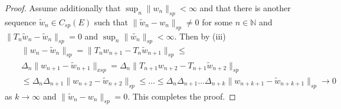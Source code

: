 \documentclass[10pt,a4paper]{amsart}
\begin{document}
\begin{proof}
Assume additionally that $\sup_n \|w_n\|_{sp}<\infty$ and that there is another sequence $\tilde{w}_n\in C_{sp}(E)$ such that $\|\tilde{w}_n-w_n\|_{sp} \neq 0$ for some $n\in \mathbb{N}$ and $\|T_n\tilde{w}_n-\tilde{w}_n\|_{sp}=0$ and $\sup_n \|\tilde{w_n}\|_{sp}<\infty$. Then by (iii)
\begin{eqnarray}
&& \|w_n-\tilde{w}_n\|_{sp}=\|T_nw_{n+1}-T_n\tilde{w}_{n+1}\|_{sp}\leq\nonumber \\
&& \Delta_n \|w_{n+1}-\tilde{w}_{n+1}\|_{x
sp} = \Delta_n \|T_{n+1}w_{n+2}-T_{n+1}\tilde{w}_{n+2}\|_{sp} \nonumber \\
&&\leq\Delta_n \Delta_{n+1} \|w_{n+2}-\tilde{w}_{n+2}\|_{sp} \leq \ldots \leq \Delta_n \Delta_{n+1} \ldots  \Delta_{n+k} \|w_{n+k+1}-\tilde{w}_{n+k+1}\|_{sp}\to 0
\end{eqnarray}
as $k\to \infty$ and $\|\tilde{w}_n-w_n\|_{sp} = 0$.
This completes the proof.
\end{proof}
\end{document}
